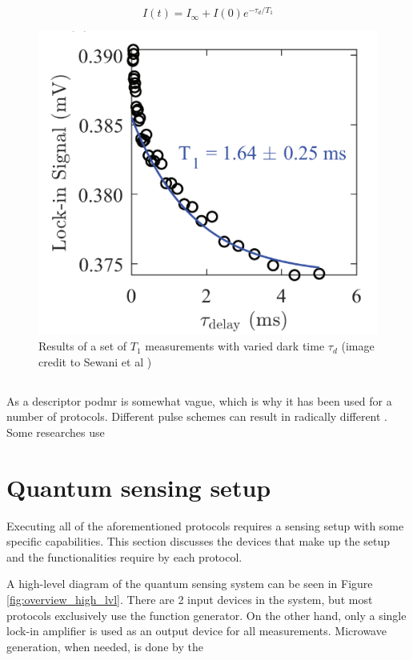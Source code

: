 \begin{equation}\label{eq:t1}
I(t)=I_\infty+I(0)e^{-\tau_d/T_1}
\end{equation}



\begin{figure}[ht]
	\centering
	\includegraphics[width=0.7\linewidth]{img/t1_result}
	\caption{Results of a set of $T_1$ measurements with varied dark time $\tau_d$ (image credit to Sewani et al \cite{sewani2020coherent})}
	\label{fig:t1result}
\end{figure}



\subsection{}
As a descriptor \gls{podmr} is somewhat vague, which is why it has been used for a number of protocols. Different pulse schemes can result in radically different . Some researches use 

\section{Quantum sensing setup}\label{chap:td:quantum_setup}
Executing all of the aforementioned protocols requires a sensing setup with some specific capabilities. This section discusses the devices that make up the setup and the functionalities require by each protocol.

A high-level diagram of the quantum sensing system can be seen in Figure \ref{fig:overview_high_lvl}. There are 2 input devices in the system, but most protocols exclusively use the function generator. On the other hand, only a single lock-in amplifier is used as an output device for all measurements. Microwave generation, when needed, is done by the 

